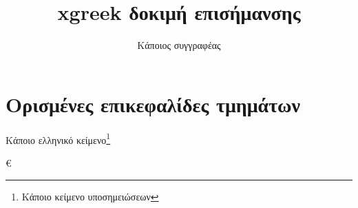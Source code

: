 \documentclass{article}
\title{xgreek δοκιμή επισήμανσης}
\author{Κάποιος συγγραφέας}
\begin{document}
\maketitle

\section{Ορισμένες επικεφαλίδες τμημάτων}
Κάποιο ελληνικό κείμενο\footnote{Κάποιο κείμενο υποσημειώσεων}

\anwtonos\par
\katwtonos\par
\koppa\par
\sampi\par
\Digamma\par
\ddigamma\par
\anoteleia\par
\euro\par
\permill\par
\stigma\par

\par
{}\par
{}

\grtoday\par
\Grtoday
\end{document}
